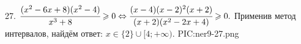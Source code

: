 27. $\cfrac{(x^2-6x+8)(x^2-4)}{x^3+8}\geqslant0\Leftrightarrow \cfrac{(x-4)(x-2)^2(x+2)}{(x+2)(x^2-2x+4)}\geqslant0.$ Применив метод интервалов, найдём ответ: $x\in\{2\}\cup[4;+\infty).$
{{PIC:ner9-27.png}}\\
